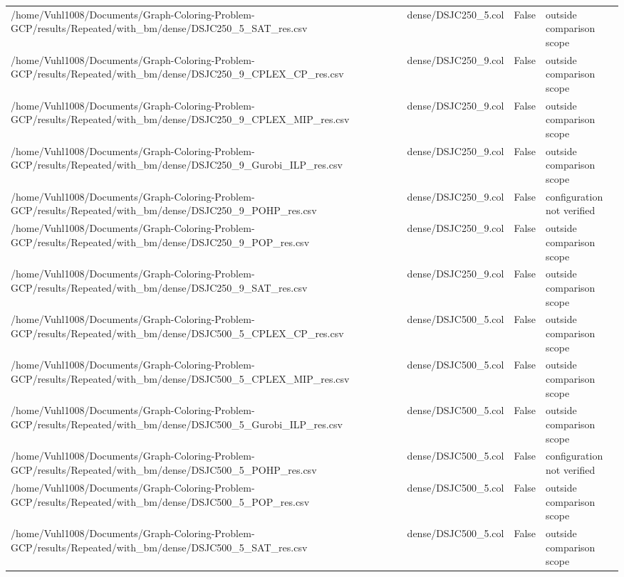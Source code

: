 \begin{table}[htbp]
\begin{tabular}{llll}
/home/Vuhl1008/Documents/Graph-Coloring-Problem-GCP/results/Repeated/with\_bm/dense/DSJC250\_5\_SAT\_res.csv & dense/DSJC250\_5.col & False & outside comparison scope \\
/home/Vuhl1008/Documents/Graph-Coloring-Problem-GCP/results/Repeated/with\_bm/dense/DSJC250\_9\_CPLEX\_CP\_res.csv & dense/DSJC250\_9.col & False & outside comparison scope \\
/home/Vuhl1008/Documents/Graph-Coloring-Problem-GCP/results/Repeated/with\_bm/dense/DSJC250\_9\_CPLEX\_MIP\_res.csv & dense/DSJC250\_9.col & False & outside comparison scope \\
/home/Vuhl1008/Documents/Graph-Coloring-Problem-GCP/results/Repeated/with\_bm/dense/DSJC250\_9\_Gurobi\_ILP\_res.csv & dense/DSJC250\_9.col & False & outside comparison scope \\
/home/Vuhl1008/Documents/Graph-Coloring-Problem-GCP/results/Repeated/with\_bm/dense/DSJC250\_9\_POHP\_res.csv & dense/DSJC250\_9.col & False & configuration not verified \\
/home/Vuhl1008/Documents/Graph-Coloring-Problem-GCP/results/Repeated/with\_bm/dense/DSJC250\_9\_POP\_res.csv & dense/DSJC250\_9.col & False & outside comparison scope \\
/home/Vuhl1008/Documents/Graph-Coloring-Problem-GCP/results/Repeated/with\_bm/dense/DSJC250\_9\_SAT\_res.csv & dense/DSJC250\_9.col & False & outside comparison scope \\
/home/Vuhl1008/Documents/Graph-Coloring-Problem-GCP/results/Repeated/with\_bm/dense/DSJC500\_5\_CPLEX\_CP\_res.csv & dense/DSJC500\_5.col & False & outside comparison scope \\
/home/Vuhl1008/Documents/Graph-Coloring-Problem-GCP/results/Repeated/with\_bm/dense/DSJC500\_5\_CPLEX\_MIP\_res.csv & dense/DSJC500\_5.col & False & outside comparison scope \\
/home/Vuhl1008/Documents/Graph-Coloring-Problem-GCP/results/Repeated/with\_bm/dense/DSJC500\_5\_Gurobi\_ILP\_res.csv & dense/DSJC500\_5.col & False & outside comparison scope \\
/home/Vuhl1008/Documents/Graph-Coloring-Problem-GCP/results/Repeated/with\_bm/dense/DSJC500\_5\_POHP\_res.csv & dense/DSJC500\_5.col & False & configuration not verified \\
/home/Vuhl1008/Documents/Graph-Coloring-Problem-GCP/results/Repeated/with\_bm/dense/DSJC500\_5\_POP\_res.csv & dense/DSJC500\_5.col & False & outside comparison scope \\
/home/Vuhl1008/Documents/Graph-Coloring-Problem-GCP/results/Repeated/with\_bm/dense/DSJC500\_5\_SAT\_res.csv & dense/DSJC500\_5.col & False & outside comparison scope \\

\end{tabular}
\end{table}
